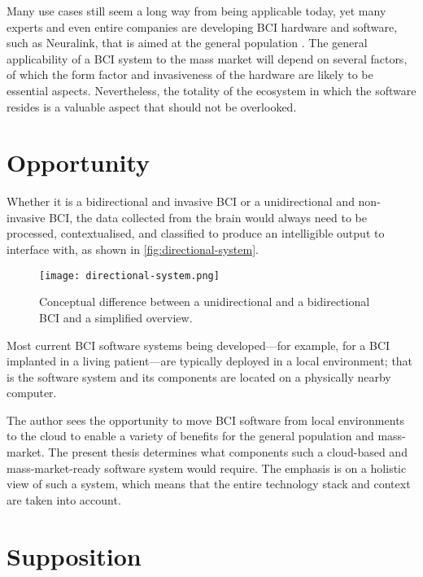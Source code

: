 Many use cases still seem a long way from being applicable today, yet many experts and even entire companies are developing BCI hardware and software, such as Neuralink, that is aimed at the general population \citep{urban_neuralink_2017}. The general applicability of a BCI system to the mass market will depend on several factors, of which the form factor and invasiveness of the hardware are likely to be essential aspects. Nevertheless, the totality of the ecosystem in which the software resides is a valuable aspect that should not be overlooked.

\section{Opportunity}
\label{chapter1-opportunity}

Whether it is a bidirectional and invasive BCI or a unidirectional and non-invasive BCI, the data collected from the brain would always need to be processed, contextualised, and classified to produce an intelligible output to interface with, as shown in \autoref{fig:directional-system}.

\begin{figure}[ht]
  \centering
  \texttt{[image: directional-system.png]}
  \caption{Conceptual difference between a unidirectional and a bidirectional BCI and a simplified overview.}
  \label{fig:directional-system}
\end{figure}

Most current BCI software systems being developed—for example, for a BCI implanted in a living patient—are typically deployed in a local environment; that is the software system and its components are located on a physically nearby computer.

The author sees the opportunity to move BCI software from local environments to the cloud to enable a variety of benefits for the general population and mass-market. The present thesis determines  what components such a cloud-based and mass-market-ready software system would require. The emphasis is on a holistic view of such a system, which means that the entire technology stack and context are taken into account.

\section{Supposition}
\label{chapter1-supposition}


